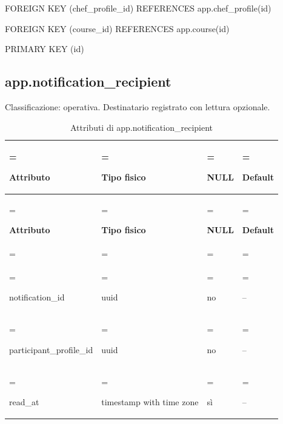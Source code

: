 \documentclass[11pt,a4paper]{article}
\begin{document}
{\ttfamily\small FOREIGN KEY (\allowbreak{}chef\_\allowbreak{}profile\_\allowbreak{}id) REFERENCES app.\allowbreak{}chef\_\allowbreak{}profile(\allowbreak{}id)}\par

{\ttfamily\small FOREIGN KEY (\allowbreak{}course\_\allowbreak{}id) REFERENCES app.\allowbreak{}course(\allowbreak{}id)}\par

{\ttfamily\small PRIMARY KEY (\allowbreak{}id)}\par

\subsection{app.notification\_recipient}

Classificazione: operativa. Destinatario registrato con lettura opzionale.

{\small \renewcommand{\arraystretch}{1.2}

\begin{xltabular}{\linewidth}{>{\hsize\linewidth=\hsize\raggedright\arraybackslash}X>{\hsize\linewidth=\hsize\raggedright\arraybackslash}X>{\hsize\linewidth=\hsize\raggedright\arraybackslash}X>{\hsize\linewidth=\hsize\raggedright\arraybackslash}X}
\caption{Attributi di app.notification\_recipient}\label{tab:dictionary-16}\\
\toprule

\textbf{Attributo} & \textbf{Tipo fisico} & \textbf{NULL} & \textbf{Default}\\\midrule\endfirsthead\toprule\textbf{Attributo} & \textbf{Tipo fisico} & \textbf{NULL} & \textbf{Default}\\\midrule\endhead
\midrule{}\\\endfoot\bottomrule\endlastfoot


{\ttfamily\small notification\_\allowbreak{}id} & {\ttfamily\small uuid} & no & {\ttfamily\small --}\\\addlinespace[3pt]

{\ttfamily\small participant\_\allowbreak{}profile\_\allowbreak{}id} & {\ttfamily\small uuid} & no & {\ttfamily\small --}\\\addlinespace[3pt]

{\ttfamily\small read\_\allowbreak{}at} & {\ttfamily\small timestamp with time zone} & sì & {\ttfamily\small --}\\*

\end{xltabular}}
\end{document}
